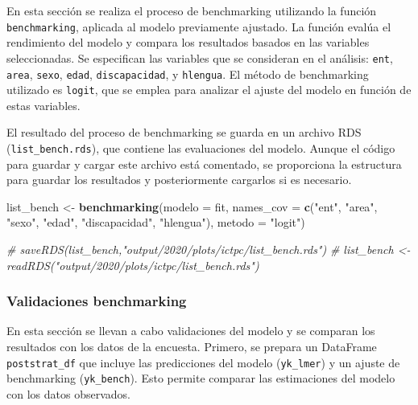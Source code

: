 \documentclass[
  12pt,
]{book}
\newenvironment{Shaded}{\begin{snugshade}}{\end{snugshade}}
\newcommand{\AttributeTok}[1]{\textcolor[rgb]{0.13,0.29,0.53}{#1}}
\newcommand{\CommentTok}[1]{\textcolor[rgb]{0.56,0.35,0.01}{\textit{#1}}}
\newcommand{\FunctionTok}[1]{\textcolor[rgb]{0.13,0.29,0.53}{\textbf{#1}}}
\newcommand{\NormalTok}[1]{#1}
\newcommand{\OtherTok}[1]{\textcolor[rgb]{0.56,0.35,0.01}{#1}}
\newcommand{\StringTok}[1]{\textcolor[rgb]{0.31,0.60,0.02}{#1}}
\begin{document}
En esta sección se realiza el proceso de benchmarking utilizando la función \texttt{benchmarking}, aplicada al modelo previamente ajustado. La función evalúa el rendimiento del modelo y compara los resultados basados en las variables seleccionadas. Se especifican las variables que se consideran en el análisis: \texttt{ent}, \texttt{area}, \texttt{sexo}, \texttt{edad}, \texttt{discapacidad}, y \texttt{hlengua}. El método de benchmarking utilizado es \texttt{logit}, que se emplea para analizar el ajuste del modelo en función de estas variables.

El resultado del proceso de benchmarking se guarda en un archivo RDS (\texttt{list\_bench.rds}), que contiene las evaluaciones del modelo. Aunque el código para guardar y cargar este archivo está comentado, se proporciona la estructura para guardar los resultados y posteriormente cargarlos si es necesario.

\begin{Shaded}
\begin{Highlighting}[]
\NormalTok{list\_bench }\OtherTok{\textless{}{-}} \FunctionTok{benchmarking}\NormalTok{(}\AttributeTok{modelo =}\NormalTok{ fit,}
             \AttributeTok{names\_cov =}   \FunctionTok{c}\NormalTok{(}\StringTok{"ent"}\NormalTok{,}
                             \StringTok{"area"}\NormalTok{,}
                             \StringTok{"sexo"}\NormalTok{,}
                             \StringTok{"edad"}\NormalTok{,}
                             \StringTok{"discapacidad"}\NormalTok{,}
                             \StringTok{"hlengua"}\NormalTok{),                      }
             \AttributeTok{metodo =} \StringTok{"logit"}\NormalTok{)}

\CommentTok{\# saveRDS(list\_bench,"output/2020/plots/ictpc/list\_bench.rds")}
\CommentTok{\# list\_bench \textless{}{-} readRDS("output/2020/plots/ictpc/list\_bench.rds")}
\end{Highlighting}
\end{Shaded}

\hypertarget{validaciones-benchmarking}{%
\subsubsection*{Validaciones benchmarking}\label{validaciones-benchmarking}}

En esta sección se llevan a cabo validaciones del modelo y se comparan los resultados con los datos de la encuesta. Primero, se prepara un DataFrame \texttt{poststrat\_df} que incluye las predicciones del modelo (\texttt{yk\_lmer}) y un ajuste de benchmarking (\texttt{yk\_bench}). Esto permite comparar las estimaciones del modelo con los datos observados.
\end{document}

